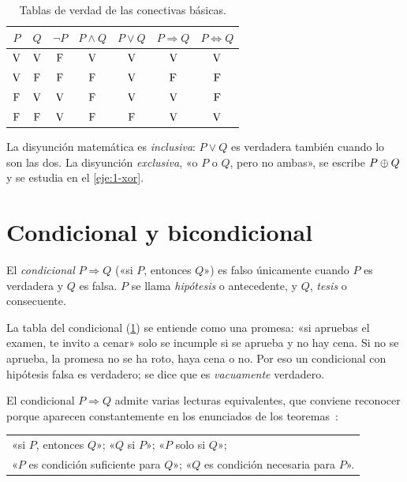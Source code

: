 \begin{table}[h]
\centering
\caption{Tablas de verdad de las conectivas básicas.}\label{tab:conectivas}
\begin{tabular}{@{}cc|ccccc@{}}
\toprule
$P$ & $Q$ & $\neg P$ & $P\wedge Q$ & $P\vee Q$ & $P\Rightarrow Q$ & $P\Leftrightarrow Q$ \\
\midrule
$\mathrm{V}$ & $\mathrm{V}$ & $\mathrm{F}$ & $\mathrm{V}$ & $\mathrm{V}$ & $\mathrm{V}$ & $\mathrm{V}$ \\
$\mathrm{V}$ & $\mathrm{F}$ & $\mathrm{F}$ & $\mathrm{F}$ & $\mathrm{V}$ & $\mathrm{F}$ & $\mathrm{F}$ \\
$\mathrm{F}$ & $\mathrm{V}$ & $\mathrm{V}$ & $\mathrm{F}$ & $\mathrm{V}$ & $\mathrm{V}$ & $\mathrm{F}$ \\
$\mathrm{F}$ & $\mathrm{F}$ & $\mathrm{V}$ & $\mathrm{F}$ & $\mathrm{F}$ & $\mathrm{V}$ & $\mathrm{V}$ \\
\bottomrule
\end{tabular}
\end{table}

La disyunción matemática es \emph{inclusiva}: $P\vee Q$ es verdadera también cuando lo son las dos. La disyunción \emph{exclusiva}, «o $P$ o $Q$, pero no ambas», se escribe $P\oplus Q$ y se estudia en el \cref{eje:1-xor}.

\section{Condicional y bicondicional}

\begin{definicion}[Condicional]\label{def:condicional}
El \emph{condicional} $P\Rightarrow Q$ («si $P$, entonces $Q$») es falso únicamente cuando $P$ es verdadera y $Q$ es falsa. $P$ se llama \emph{hipótesis} o antecedente, y $Q$, \emph{tesis} o consecuente.
\end{definicion}

La tabla del condicional (\cref{tab:conectivas}) se entiende como una promesa: «si apruebas el examen, te invito a cenar» solo se incumple si se aprueba y no hay cena. Si no se aprueba, la promesa no se ha roto, haya cena o no. Por eso un condicional con hipótesis falsa es verdadero; se dice que es \emph{vacuamente} verdadero.

El condicional $P\Rightarrow Q$ admite varias lecturas equivalentes, que conviene reconocer porque aparecen constantemente en los enunciados de los teoremas~\cite[§2.3]{hammack}:
\begin{center}
\begin{tabular}{@{}l@{}}
«si $P$, entonces $Q$»; \quad «$Q$ si $P$»; \quad «$P$ solo si $Q$»; \\
«$P$ es condición suficiente para $Q$»; \quad «$Q$ es condición necesaria para $P$».
\end{tabular}
\end{center}

